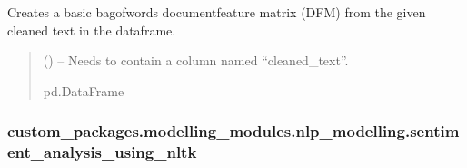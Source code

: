 \documentclass[letterpaper,10pt,english]{sphinxhowto}
\begin{document}
\begin{fulllineitems}
\label{\detokenize{_autosummary/custom_packages.modelling_modules.nlp_modelling.get_document_feature_matrix:custom_packages.modelling_modules.nlp_modelling.get_document_feature_matrix}}
\pysigstartsignatures
\pysiglinewithargsret
{}
{}
{}
\pysigstopsignatures
\sphinxAtStartPar
Creates a basic bag\sphinxhyphen{}of\sphinxhyphen{}words document\sphinxhyphen{}feature matrix (DFM) from the given cleaned text in the dataframe.
\begin{quote}\begin{description}
\sphinxAtStartPar
{} () – Needs to contain a column named “cleaned\_text”.

\sphinxAtStartPar
{}

\sphinxAtStartPar
pd.DataFrame

\end{description}\end{quote}

\end{fulllineitems}


\sphinxstepscope


\subsubsection{custom\_packages.modelling\_modules.nlp\_modelling.sentiment\_analysis\_using\_nltk}
\label{\detokenize{_autosummary/custom_packages.modelling_modules.nlp_modelling.sentiment_analysis_using_nltk:custom-packages-modelling-modules-nlp-modelling-sentiment-analysis-using-nltk}}\label{\detokenize{_autosummary/custom_packages.modelling_modules.nlp_modelling.sentiment_analysis_using_nltk::doc}}
\end{document}
